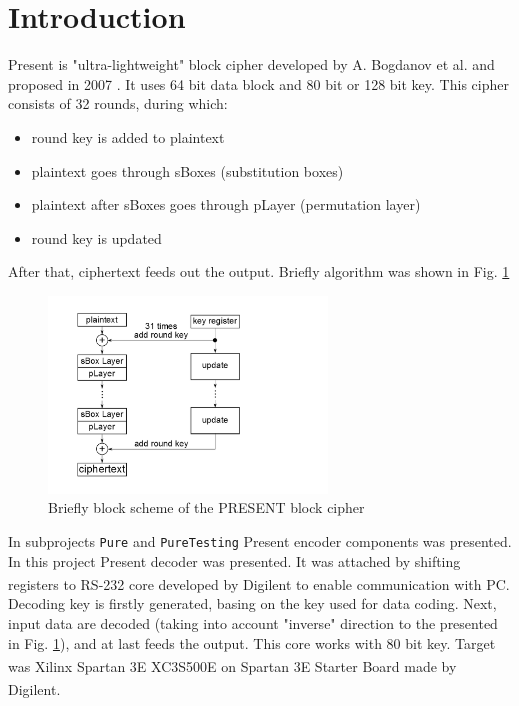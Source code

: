 \documentclass{gajewski}
\begin{document}
\maketitle

\newpage

\revisionTable

\newpage

\tableofcontents
\newpage

\section{Introduction}

Present is "ultra-lightweight" block cipher developed by A. Bogdanov et al. and proposed in 2007 \cite{PRESENT}. It uses 64 bit data block and 80 bit or 128 bit key.
This cipher consists of 32 rounds, during which: 
\begin{itemize}
    \item round key is added to plaintext
    \item plaintext goes through sBoxes (substitution boxes)
    \item plaintext after sBoxes goes through pLayer (permutation layer)
    \item round key is updated
\end{itemize}
After that, ciphertext feeds out the output. Briefly algorithm was shown in Fig. \ref{pAlgorithm}
\begin{figure}[!ht]%
    \begin{center}
    \includegraphics[width=0.66\textwidth]{img/presentAlgorithm.png}
    \caption{%
        Briefly block scheme of the PRESENT block cipher
     }%
    \label{pAlgorithm}
    \end{center}
 \end{figure}

In subprojects \texttt{Pure} and \texttt{PureTesting} Present encoder components was presented. In this project Present decoder was presented. It was attached by shifting registers to RS-232 core developed by Digilent\textsuperscript{\textregistered} to enable communication with PC. Decoding key is firstly generated, basing on the key used for data coding. Next, input data are decoded (taking into account "inverse" direction to the presented in Fig. \ref{pAlgorithm}), and at last feeds the output. This core works with 80 bit key. Target was Xilinx\textsuperscript{\textregistered} Spartan 3E XC3S500E \cite{Spartan} on Spartan 3E  Starter Board \cite{Digilent} made by Digilent\textsuperscript{\textregistered}.
\end{document}
